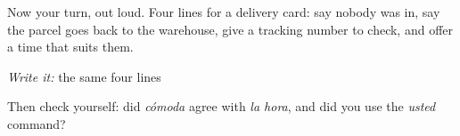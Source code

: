 \begin{tcolorbox}[breakable,colback=teal!4,colframe=teal!35!black,title={Before you move on}]
Now your turn, out loud. Four lines for a delivery card: say nobody was in, say the parcel goes back to the warehouse, give a tracking number to check, and offer a time that suits them.

\emph{Write it:} the same four lines

Then check yourself: did \emph{cómoda} agree with \emph{la hora}, and did you use the \emph{usted} command?
\end{tcolorbox}
